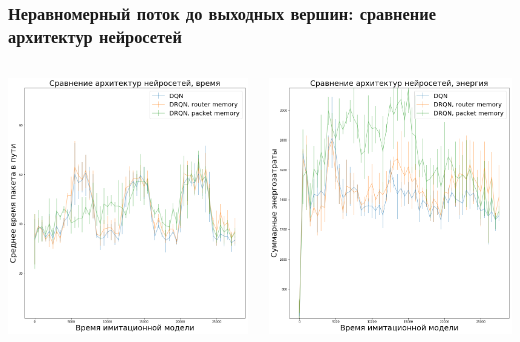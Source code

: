 \documentclass{beamer}
\begin{document}
\begin{frame}
  \frametitle{Неравномерный поток до выходных вершин: сравнение архитектур нейросетей}
  \begin{columns}
    \begin{column}{0.5\textwidth}
      \includegraphics[width=\textwidth]{experiment-conveyors-en1-time-nns-tall}
    \end{column}
    \begin{column}{0.5\textwidth}
      \includegraphics[width=\textwidth]{experiment-conveyors-en1-energy-nns-tall}
    \end{column}
  \end{columns}
\end{frame}
\end{document}
